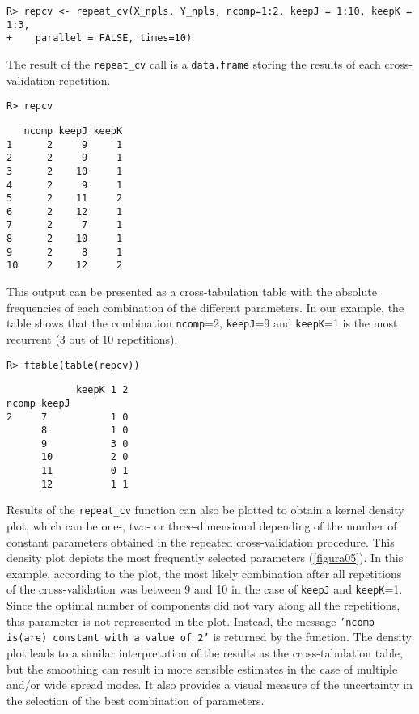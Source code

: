 \medskip
\begin{verbatim}
R> repcv <- repeat_cv(X_npls, Y_npls, ncomp=1:2, keepJ = 1:10, keepK = 1:3,  
+    parallel = FALSE, times=10)
\end{verbatim}

\medskip
The result of the \texttt{repeat\_cv} call is a \texttt{data.frame} storing the results of each cross-validation repetition. 

\begin{verbatim}
R> repcv
\end{verbatim}

\begin{verbatim}
   ncomp keepJ keepK
1      2     9     1
2      2     9     1
3      2    10     1
4      2     9     1
5      2    11     2
6      2    12     1
7      2     7     1
8      2    10     1
9      2     8     1
10     2    12     2
\end{verbatim}

This output can be presented as a cross-tabulation table with the absolute frequencies of each combination of the different parameters. In our example, the table shows that the combination \texttt{ncomp}=2, \texttt{keepJ}=9 and \texttt{keepK}=1 is the most recurrent (3 out of 10 repetitions).

\begin{verbatim}
R> ftable(table(repcv))
\end{verbatim}

\begin{verbatim}
            keepK 1 2
ncomp keepJ          
2     7           1 0
      8           1 0
      9           3 0
      10          2 0
      11          0 1
      12          1 1
\end{verbatim}

Results of the \texttt{repeat\_cv} function can also be plotted to obtain a kernel density plot, which can be one-, two- or three-dimensional depending of the number of constant parameters obtained in the repeated cross-validation procedure. This density plot depicts the most frequently selected parameters (\autoref{figura05}). In this example, according to the plot, the most likely combination after all repetitions of the cross-validation was between 9 and 10 in the case of \texttt{keepJ} and \texttt{keepK}=1. Since the optimal number of components did not vary along all the repetitions, this parameter is not represented in the plot. Instead, the message \texttt{'ncomp is(are) constant with a value of 2'} is returned by the function. The density plot leads to a similar interpretation of the results as the cross-tabulation table, but the smoothing can result in more sensible estimates in the case of multiple and/or wide spread modes. It also provides a visual measure of the uncertainty in the selection of the best combination of parameters.

